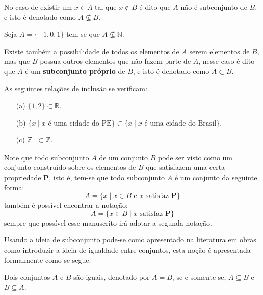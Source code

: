 No caso de existir um $x \in A$ tal que $x \notin B$ é dito que $A$ não é subconjunto de $B$, e isto é denotado como $A \not\subseteq B$. 

\begin{example}\label{exe:NaoInclusao}
	Seja $A = \{-1, 0, 1\}$ tem-se que $A \not\subseteq \mathbb{N}$.
\end{example}

Existe também a possibilidade de todos os elementos de $A$ serem elementos de $B$, mas que $B$ possua outros elementos que não fazem parte de $A$, nesse caso é dito que $A$ é um \textbf{subconjunto próprio} de $B$, e isto é denotado como $A \subset B$. 

\begin{example}\label{exe:InclusaoPropria}
	As seguintes relações de inclusão se verificam:
	\begin{itemize}
		\item[(a)] $\{1, 2\} \subset \mathbb{R}$.
		\item[(b)] $\{x \mid x \mbox{ é uma cidade do PE}\} \subset \{x \mid x \mbox{ é uma cidade do Brasil}\}$.
		\item[(c)] $\mathbb{Z}_+ \subset \mathbb{Z}$.
	\end{itemize}
\end{example}

\begin{remark}
	Note que todo subconjunto $A$ de um conjunto $B$ pode ser visto como um conjunto construído sobre os elementos de $B$ que satisfazem uma certa propriedade $\textbf{P}$, isto é, tem-se que todo subconjunto $A$ é um conjunto da seguinte forma:
	$$A = \{x \mid x \in B \mbox{ e } x \mbox{ satisfaz } \textbf{P}\}$$
	também é possível encontrar a notação:
	$$A = \{x \in B  \mid x \mbox{ satisfaz } \textbf{P}\}$$
	sempre que possível esse manuscrito irá adotar a segunda notação.
\end{remark}

Usando a ideia de subconjunto pode-se como apresentado na literatura em obras como \cite{abe1991-TC, halmos2001, lipschutz1978-TC} introduzir a ideia de igualdade entre conjuntos, esta noção é apresentada formalmente como se segue.

\begin{definition}\label{def:IgualdadeConjuntos}
	\cite{abe1991-TC} Dois conjuntos $A$ e $B$ são iguais, denotado por $A = B$, se e somente se, $A \subseteq B$ e $B \subseteq A$.
\end{definition}

